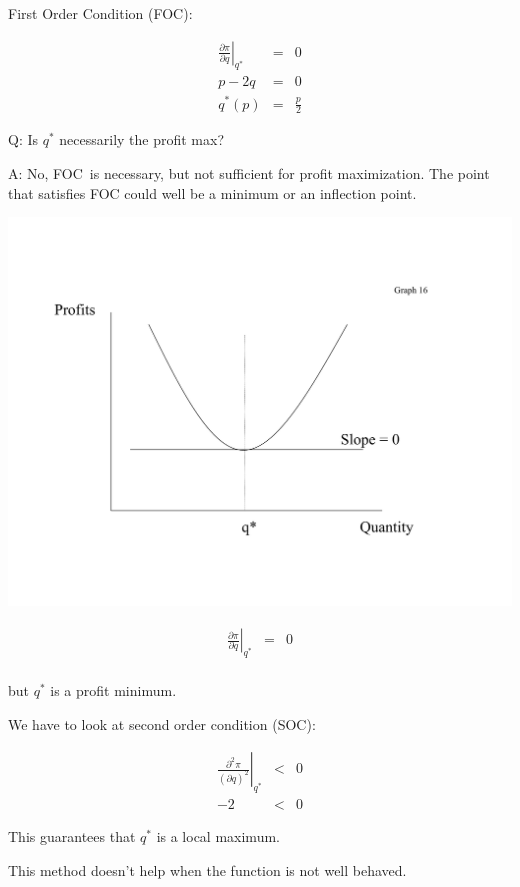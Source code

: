 \documentclass[11pt,english]{article}
\begin{document}
\bigskip

First Order Condition (FOC):

\begin{eqnarray*}
\left. \frac{\partial \pi }{\partial q}\right| _{q^{\ast }}&=&0 \\
p-2q& = &0 \\ 
q^*(p)& = &\frac{p}{2}
\end{eqnarray*}

Q: Is $q^{\ast }$ necessarily the profit max?

A: No, FOC\ is necessary, but not sufficient for profit maximization. The
point that satisfies FOC could well be a minimum or an inflection point.

\bigskip
\includegraphics[scale=0.6]{math2.pdf}


\begin{eqnarray*}
\left. \frac{\partial \pi }{\partial q}\right| _{q^{\ast }}&=&0 \\
\end{eqnarray*}

but $q^{\ast }$ is a profit minimum.

We have to look at second order condition (SOC):

\begin{eqnarray*}
\left. \frac{\partial ^{2}\pi }{\left( \partial q\right) ^{2}}\right|
_{q^{\ast }}&<&0 \\
-2&<&0
\end{eqnarray*}

This guarantees that $q^{\ast }$ is a local maximum.

This method doesn't help when the function is not well behaved.
\end{document}
